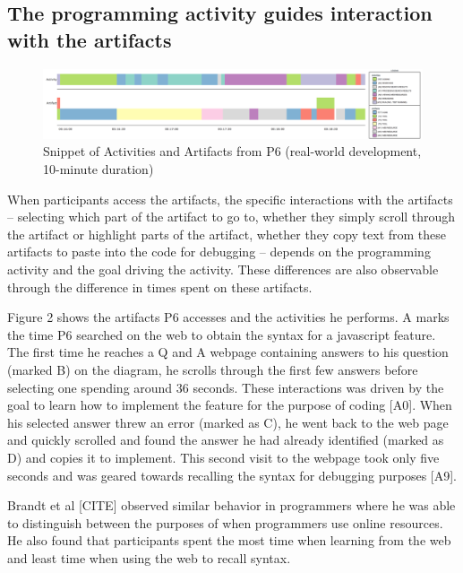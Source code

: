 \subsection{The programming activity guides interaction with the artifacts}

\begin{figure}
\includegraphics[width=\columnwidth]{figures/P6timeplot}
\caption{Snippet of Activities and Artifacts from P6 (real-world development, 10-minute duration)}
\end{figure}

When participants access the artifacts, the specific interactions with the artifacts -- selecting which part of the artifact to go to, whether they simply scroll through the artifact or highlight parts of the artifact, whether they copy text from these artifacts to paste into the code for debugging -- depends on the programming activity and the goal driving the activity. These differences are also observable through the difference in times spent on these artifacts.

Figure 2 shows the artifacts P6 accesses and the activities he performs. A marks the time P6 searched on the web to obtain the syntax for a javascript feature. The first time he reaches a Q and A webpage containing answers to his question (marked B) on the diagram, he scrolls through the first few answers before selecting one spending around 36 seconds. These interactions was driven by the goal to learn how to implement the feature for the purpose of coding [A0]. When his selected answer threw an error (marked as C), he went back to the web page and quickly scrolled and found the answer he had already identified (marked as D) and copies it to implement. This second visit to the webpage took only five seconds and was geared towards recalling the syntax for debugging purposes [A9]. 

Brandt et al [CITE] observed similar behavior in programmers where he was able to distinguish between the purposes of when programmers use online resources. He also found that participants spent the most time when learning from the web and least time when using the web to recall syntax.

